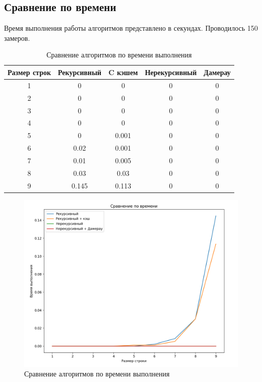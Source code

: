 \documentclass{article}
\begin{document}
\subsection{Сравнение  по времени}
Время выполнения работы алгоритмов представлено в секундах. Проводилось 150 замеров.

\begin{table}[h]
	\begin{center}
	\caption{\label{tbl:all_time_cmp} Сравнение алгоритмов по времени выполнения}
	\begin{tabular}{|c|c|c|c|c|}
		\hline
		Размер строк & Рекурсивный & C кэшем &  Нерекурсивный & Дамерау
		\\ \hline
		1 & 0 & 0 & 0 & 0
		\\ \hline
		2 & 0 & 0 & 0 & 0
		\\ \hline
		3 & 0 & 0 & 0 & 0
		\\ \hline
		4 & 0 & 0 & 0 & 0
		\\ \hline
		5 & 0 & 0.001 & 0 & 0
		\\ \hline
		6 & 0.02 & 0.001 & 0 & 0
		\\ \hline
		7 & 0.01 & 0.005 & 0 & 0
		\\ \hline
		8 & 0.03 & 0.03 & 0 & 0
		\\ \hline
		9 & 0.145 & 0.113 & 0 & 0
		\\ \hline
	\end{tabular}
	\end{center}
\end{table}

\begin{figure}[h]
	\centering
	\includegraphics[scale=0.7]{tools/Screenshot_1.png}
	\caption{Сравнение алгоритмов по времени выполнения}
\end{figure}
\end{document}
